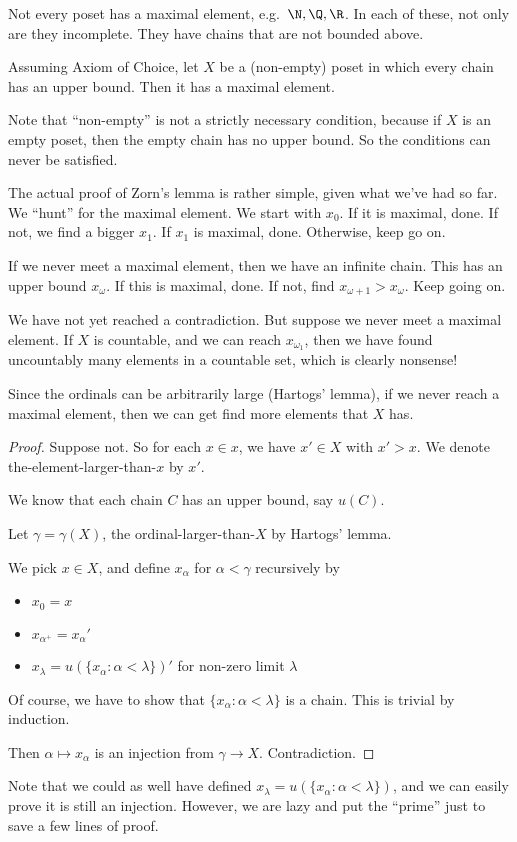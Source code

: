 \documentclass[a4paper]{article}
\begin{document}
Not every poset has a maximal element, e.g.\ $\N, \Q, \R$. In each of these, not only are they incomplete. They have chains that are not bounded above.

\begin{thm}
  Assuming Axiom of Choice, let $X$ be a (non-empty) poset in which every chain has an upper bound. Then it has a maximal element.
\end{thm}
Note that ``non-empty'' is not a strictly necessary condition, because if $X$ is an empty poset, then the empty chain has no upper bound. So the conditions can never be satisfied.

The actual proof of Zorn's lemma is rather simple, given what we've had so far. We ``hunt'' for the maximal element. We start with $x_0$. If it is maximal, done. If not, we find a bigger $x_1$. If $x_1$ is maximal, done. Otherwise, keep go on.

If we never meet a maximal element, then we have an infinite chain. This has an upper bound $x_\omega$. If this is maximal, done. If not, find $x_{\omega + 1} > x_\omega$. Keep going on.

We have not yet reached a contradiction. But suppose we never meet a maximal element. If $X$ is countable, and we can reach $x_{\omega_1}$, then we have found uncountably many elements in a countable set, which is clearly nonsense!

Since the ordinals can be arbitrarily large (Hartogs' lemma), if we never reach a maximal element, then we can get find more elements that $X$ has.

\begin{proof}
  Suppose not. So for each $x\in x$, we have $x'\in X$ with $x' > x$. We denote the-element-larger-than-$x$ by $x'$.

  We know that each chain $C$ has an upper bound, say $u(C)$.

  Let $\gamma = \gamma(X)$, the ordinal-larger-than-$X$ by Hartogs' lemma.

  We pick $x\in X$, and define $x_\alpha$ for $\alpha < \gamma$ recursively by
  \begin{itemize}
    \item $x_0 = x$
    \item $x_{\alpha^+} = x_\alpha'$
    \item $x_{\lambda} = u(\{x_\alpha: \alpha < \lambda\})'$ for non-zero limit $\lambda$
  \end{itemize}
  Of course, we have to show that $\{x_\alpha: \alpha < \lambda\}$ is a chain. This is trivial by induction.

  Then $\alpha \mapsto x_\alpha$ is an injection from $\gamma\to X$. Contradiction.
\end{proof}
Note that we could as well have defined $x_\lambda = u(\{x_\alpha : \alpha < \lambda\})$, and we can easily prove it is still an injection. However, we are lazy and put the ``prime'' just to save a few lines of proof.
\end{document}
